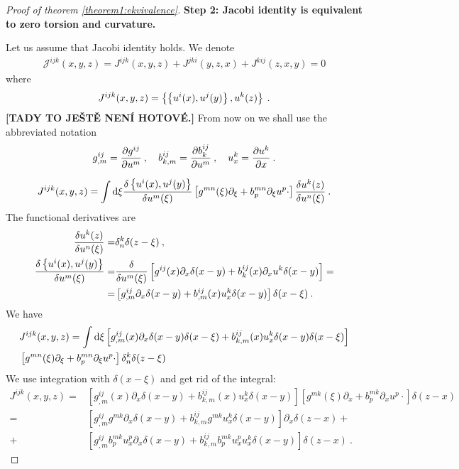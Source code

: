 \begin{proof}[Proof of theorem \ref{theorem1:ekvivalence}]
    \textbf{Step 2: Jacobi identity is equivalent to zero torsion and curvature.} 
    
    Let us assume that Jacobi identity holds. We denote
    \begin{align}
        \mathcal J^{ijk}(x,y,z) = J^{ijk}(x,y,z)+ J^{jki}(y,z,x)+ J^{kij}(z,x,y) = 0
    \end{align}
    where
    \begin{align}
        J^{ijk}(x,y,z) = \left \lbrace \left \lbrace u^i(x),u^j(y) \right \rbrace, u^k(z) \right \rbrace \:.
    \end{align}
    \textbf{[TADY TO JEŠTĚ NENÍ HOTOVÉ.]}
    From now on we shall use the abbreviated notation
    \begin{align}
        g^{ij}_{,m} = \frac{\partial g^{ij}}{\partial u^m} \:, \quad b^{ij}_{k,m} = \frac{\partial b^{ij}_k}{\partial u^m} \:, \quad u^k_x = \frac{\partial u^k}{\partial x}  \:.
    \end{align}

    \begin{align*}
        J^{ijk}(x,y,z) =
        \int \mathrm{d} \xi \frac{\delta \left \lbrace u^i(x),u^j(y) \right \rbrace}{\delta u^m(\xi)} 
        \left[ g^{mn}(\xi) \partial_\xi + b^{mn}_p \partial_\xi u^p \cdot \right] \frac{\delta u^k(z)}{\delta u^n(\xi)}  \:.
    \end{align*}
    The functional derivatives are
    \begin{align}
        \frac{\delta u^k(z)}{\delta u^n(\xi)} =& \delta^k_n \delta(z-\xi) \:, \\
        \frac{\delta \left \lbrace u^i(x),u^j(y) \right \rbrace}{\delta u^m(\xi)} =& \frac{\delta }{\delta u^m(\xi)} \left[ g^{ij}(x) \partial_x \delta(x-y) + b^{ij}_k(x) \partial_x u^k \delta(x-y)\right] = 
        \nonumber
        \\ =& \left[ g^{ij}_{,m} \partial_x \delta(x-y) + b^{ij}_{,m}(x) u^k_x \delta(x-y) \right] \delta (x-\xi) \:.
    \end{align}
    We have
    \begin{align*}
        & J^{ijk}(x,y,z) = \int \mathrm{d} \xi  \left[ g^{ij}_{,m}(x) \partial_x \delta(x-y) \delta(x-\xi) + b^{ij}_{k,m}(x) u^k_x \delta(x-y) \delta(x-\xi) \right]   \\ 
        & \left[ g^{mn}(\xi) \partial_\xi + b^{mn}_p \partial_\xi u^p \cdot \right] \delta^k_n \delta(z-\xi)
    \end{align*}
    We use integration with $\delta(x-\xi)$ and get rid of the integral:
    \begin{align*}
        J^{ijk}(x,y,z) =& \left[ g^{ij}_{,m}(x) \partial_x \delta(x-y) + b^{ij}_{k,m}(x) u^k_x \delta(x-y) \right] 
        \left[ g^{mk}(\xi) \partial_x + b^{mk}_p \partial_x u^p \cdot \right] \delta(z-x)
        \\
        =& \left[ g^{ij}_{,m} g^{mk} \partial_x \delta(x-y) + b^{ij}_{k,m} g^{mk} u^k_x \delta(x-y) \right] \partial_x \delta(z-x) + 
        \\
        +& \left[ g^{ij}_{,m} b^{mk}_p u^p_x \partial_x \delta(x-y) + b^{ij}_{k,m} b^{mk}_p u_x^p  u_x^k \delta(x-y) \right] \delta(z-x) \:.
    \end{align*}


\end{proof}
